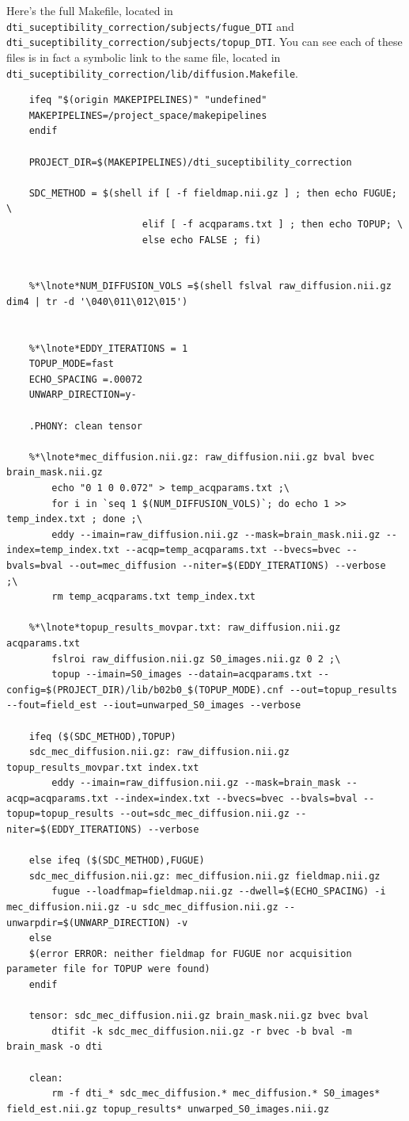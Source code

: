 Here's the full Makefile, located in
\texttt{dti_suceptibility_correction/subjects/fugue_DTI} and
\texttt{dti_suceptibility_correction/subjects/topup_DTI}. You can see
each of these files is in fact a symbolic link to the same file, located in
\texttt{dti_suceptibility_correction/lib/diffusion.Makefile}.

\setcounter{codehighlight}{0}
\begin{lstlisting}
	ifeq "$(origin MAKEPIPELINES)" "undefined"
	MAKEPIPELINES=/project_space/makepipelines
	endif

	PROJECT_DIR=$(MAKEPIPELINES)/dti_suceptibility_correction

	SDC_METHOD = $(shell if [ -f fieldmap.nii.gz ] ; then echo FUGUE; \
	                    elif [ -f acqparams.txt ] ; then echo TOPUP; \
	                    else echo FALSE ; fi)


	%*\lnote*NUM_DIFFUSION_VOLS =$(shell fslval raw_diffusion.nii.gz dim4 | tr -d '\040\011\012\015')


	%*\lnote*EDDY_ITERATIONS = 1
	TOPUP_MODE=fast
	ECHO_SPACING =.00072
	UNWARP_DIRECTION=y-

	.PHONY: clean tensor

	%*\lnote*mec_diffusion.nii.gz: raw_diffusion.nii.gz bval bvec brain_mask.nii.gz
		echo "0 1 0 0.072" > temp_acqparams.txt ;\
		for i in `seq 1 $(NUM_DIFFUSION_VOLS)`; do echo 1 >> temp_index.txt ; done ;\
		eddy --imain=raw_diffusion.nii.gz --mask=brain_mask.nii.gz --index=temp_index.txt --acqp=temp_acqparams.txt --bvecs=bvec --bvals=bval --out=mec_diffusion --niter=$(EDDY_ITERATIONS) --verbose  ;\
		rm temp_acqparams.txt temp_index.txt

	%*\lnote*topup_results_movpar.txt: raw_diffusion.nii.gz acqparams.txt
		fslroi raw_diffusion.nii.gz S0_images.nii.gz 0 2 ;\
		topup --imain=S0_images --datain=acqparams.txt --config=$(PROJECT_DIR)/lib/b02b0_$(TOPUP_MODE).cnf --out=topup_results --fout=field_est --iout=unwarped_S0_images --verbose

	ifeq ($(SDC_METHOD),TOPUP)
	sdc_mec_diffusion.nii.gz: raw_diffusion.nii.gz topup_results_movpar.txt index.txt
		eddy --imain=raw_diffusion.nii.gz --mask=brain_mask --acqp=acqparams.txt --index=index.txt --bvecs=bvec --bvals=bval --topup=topup_results --out=sdc_mec_diffusion.nii.gz --niter=$(EDDY_ITERATIONS) --verbose
		
	else ifeq ($(SDC_METHOD),FUGUE)
	sdc_mec_diffusion.nii.gz: mec_diffusion.nii.gz fieldmap.nii.gz
		fugue --loadfmap=fieldmap.nii.gz --dwell=$(ECHO_SPACING) -i mec_diffusion.nii.gz -u sdc_mec_diffusion.nii.gz --unwarpdir=$(UNWARP_DIRECTION) -v
	else
	$(error ERROR: neither fieldmap for FUGUE nor acquisition parameter file for TOPUP were found)
	endif

	tensor: sdc_mec_diffusion.nii.gz brain_mask.nii.gz bvec bval
		dtifit -k sdc_mec_diffusion.nii.gz -r bvec -b bval -m brain_mask -o dti

	clean:
		rm -f dti_* sdc_mec_diffusion.* mec_diffusion.* S0_images* field_est.nii.gz topup_results* unwarped_S0_images.nii.gz

\end{lstlisting}


